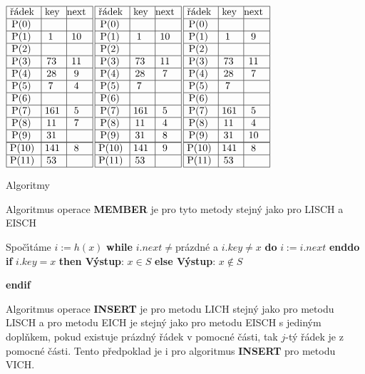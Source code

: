 \documentclass[a4paper,12pt]{article}
\begin{document}
$\vbox {\hbox{\vtop{\offinterlineskip\halign{\strut\vrule\ # & \vrule\ # & \vrule\hfil # \hfil\vrule\cr\noalign{\hrule}\v r\'adek & key & next \hfil\cr\noalign{\hrule}P(0) & &\hfill \cr\noalign{\hrule}P(1) & 1 & 10 \cr\noalign{\hrule}P(2) & &\hfill \cr\noalign{\hrule}P(3) & 73 & 11 \cr\noalign{\hrule}P(4) & 28 & 9 \cr\noalign{\hrule}P(5) & 7 & 4 \cr\noalign{\hrule}P(6) &  &\hfill \cr\noalign{\hrule}P(7) & 161 & 5 \cr\noalign{\hrule}P(8) & 11 & 7 \cr\noalign{\hrule}P(9) & 31 &\hfill \cr\noalign{\hrule}\noalign{\hrule}P(10) & 141 & 8 \cr\noalign{\hrule}P(11) & 53 & \hfill \cr\noalign{\hrule}}}\,\vtop{\offinterlineskip\halign{\strut\vrule\ # & \vrule\ # & \vrule\hfil# \hfil\vrule\cr\noalign{\hrule}\v r\'adek & key & next \hfil\cr\noalign{\hrule}P(0) & &\hfill \cr\noalign{\hrule}P(1) & 1 & 10 \cr\noalign{\hrule}P(2) & &\hfill \cr\noalign{\hrule}P(3) & 73 & 11 \cr\noalign{\hrule}P(4) & 28 & 7 \cr\noalign{\hrule}P(5) & 7 & \hfill \cr\noalign{\hrule}P(6) &  &\hfill \cr\noalign{\hrule}P(7) & 161 & 5 \cr\noalign{\hrule}P(8) & 11 & 4 \cr\noalign{\hrule}P(9) & 31 & 8 \cr\noalign{\hrule}\noalign{\hrule}P(10) & 141 & 9 \cr\noalign{\hrule}P(11) & 53 & \hfill \cr\noalign{\hrule}}}\,\vtop{\offinterlineskip\halign {\strut\vrule\ # & \vrule\ # & \vrule \hfil # \hfil \vrule\cr\noalign{\hrule}\v r\'adek & key & next \hfil \cr\noalign{\hrule}P(0) & &\hfill \cr\noalign{\hrule}P(1) & 1 & 9 \cr\noalign{\hrule}P(2) & &\hfill \cr\noalign{\hrule}P(3) & 73 & 11 \cr\noalign{\hrule}P(4) & 28 & 7 \cr\noalign{\hrule}P(5) & 7 & \hfill \cr\noalign{\hrule}P(6) & & \hfill \cr\noalign{\hrule}P(7) & 161 & 5 \cr\noalign{\hrule}P(8) & 11 & 4  \cr\noalign{\hrule}P(9) & 31 & 10 \cr\noalign{\hrule}\noalign{\hrule}P(10) & 141 & 8 \cr\noalign{\hrule}P(11) & 53 & \hfill \cr\noalign{\hrule}}}}}$
\medskip

\subhead
Algoritmy
\endsubhead
\smallskip

\flushpar Algoritmus operace {\bf MEMBER} je pro tyto metody 
stejn\'y jako pro LISCH a EISCH
\bigskip

\newline 
Spo\v c\'\i t\'ame $i:=h(x)$\newline 
{\bf while} $i.next\ne$pr\'azdn\'e a $i.key\ne x$ {\bf do} $i:=i.
next$ {\bf enddo\newline 
if} $i.key=x$ {\bf then V\'ystup}: $x\in S$ {\bf else V\'ystup}: $
x\notin S$ {\bf endif
\medskip

}\flushpar Algoritmus operace {\bf INSERT} je pro metodu LICH stejn\'y 
jako pro metodu LISCH a pro metodu EICH je stejn\'y jako 
pro metodu EISCH s jedin\'ym dopl\v nkem, pokud existuje 
pr\'azdn\'y \v r\'adek v pomocn\'e \v c\'asti, tak $j$-t\'y \v r\'adek je z 
pomocn\'e \v c\'asti. Tento p\v redpoklad je i pro algoritmus 
{\bf INSERT} pro metodu VICH.
\bigskip
\end{document}
